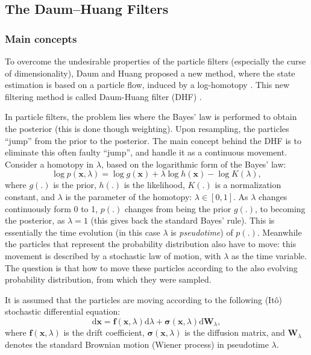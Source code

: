 \subsection{The Daum--Huang Filters}
\subsubsection{Main concepts}
To overcome the  undesirable properties of the particle filters (especially the curse of dimensionality), Daum and Huang proposed a new method, where the state estimation is based on a particle flow, induced by a log-homotopy \cite{Daum2007}. This new filtering method is called Daum-Huang filter (DHF) \cite{Choi2011}.

In particle filters, the problem lies where the Bayes' law is performed to obtain the posterior (this is done though weighting). Upon resampling, the particles ``jump'' from the prior to the posterior. The main concept behind the DHF is to eliminate this often faulty ``jump'', and handle it as a continuous movement. Consider a homotopy in $\lambda$, based on the logarithmic form of the Bayes' law:
\begin{equation}\label{eq:bayes-loghom}
  \log p(\mathbf{x},\lambda) = \log g(\mathbf{x}) + \lambda \log h(\mathbf{x}) - \log K(\lambda),
\end{equation}
where $g(.)$ is the prior, $h(.)$ is the likelihood, $K(.)$ is a normalization constant, and $\lambda$ is the parameter of the homotopy: $\lambda \in [0,1]$. As $\lambda$ changes continuously form 0 to 1, $p(.)$ changes from being the prior $g(.)$, to becoming the posterior, as $\lambda = 1$ (this gives back the standard Bayes' rule). This is essentially the time evolution (in this case $\lambda$ is \emph{pseudotime}) of $p(.)$. Meanwhile the particles that represent the probability distribution also have to move: this movement is described by a stochastic law of motion, with $\lambda$ as the time variable. The question is that how to move these particles according to the also evolving probability distribution, from which they were sampled.

It is assumed that the particles are moving according to the following (It\^{o}) stochastic  differential equation:
\begin{equation}\label{eq:dhf-sde}
  \mathrm{d} \mathbf{x}=\mathbf{f}(\mathbf{x}, \lambda) \mathrm{d} \lambda+\boldsymbol{\sigma}(\mathbf{x}, \lambda) \mathrm{d} \mathbf{W}_{\lambda},
\end{equation}
where $\mathbf{f}(\mathbf{x},\lambda)$ is the drift coefficient,
$\boldsymbol\sigma(\mathbf{x},\lambda)$ is the diffusion matrix,
and $\mathbf{W}_\lambda$ denotes the standard Brownian motion (Wiener process) in
pseudotime $\lambda$.

